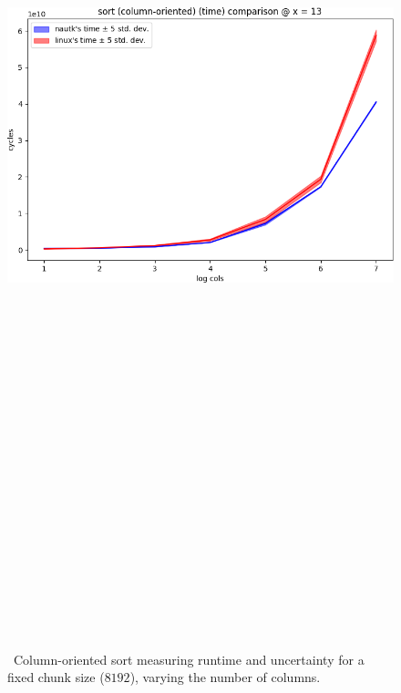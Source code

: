 \begin{figure}
  \includegraphics[height=30cm]{plots/sort.png}
  \caption{~Column-oriented sort measuring runtime and uncertainty for a fixed chunk size ($8192$), varying the number of columns.}
  \label{fig:sort}
\end{figure}

